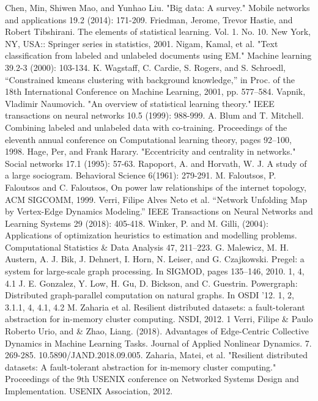 \documentclass[conference]{IEEEtran}
\begin{document}
\newpage
\begin{thebibliography}{00}
 Chen, Min, Shiwen Mao, and Yunhao Liu. "Big data: A survey." Mobile networks and applications 19.2 (2014): 171-209.
 Friedman, Jerome, Trevor Hastie, and Robert Tibshirani. The elements of statistical learning. Vol. 1. No. 10. New York, NY, USA:: Springer series in statistics, 2001.
 Nigam, Kamal, et al. "Text classification from labeled and unlabeled documents using EM." Machine learning 39.2-3 (2000): 103-134.
 K. Wagstaff, C. Cardie, S. Rogers, and S. Schroedl, “Constrained kmeans clustering with background knowledge,” in Proc. of the 18th International Conference on Machine Learning, 2001, pp. 577–584.
 Vapnik, Vladimir Naumovich. "An overview of statistical learning theory." IEEE transactions on neural networks 10.5 (1999): 988-999.
A. Blum and T. Mitchell. Combining labeled and unlabeled data with co-training. Proceedings of the eleventh annual conference on Computational learning theory, pages 92–100, 1998.
Hage, Per, and Frank Harary. "Eccentricity and centrality in networks." Social networks 17.1 (1995): 57-63.
Rapoport, A. and Horvath, W. J. A study of a large sociogram. Behavioral Science 6(1961): 279-291. 
M. Faloutsos, P. Faloutsos and C. Faloutsos, On power law 
relationships of the internet topology, ACM SIGCOMM, 1999. 
 Verri, Filipe Alves Neto et al. “Network Unfolding Map by Vertex-Edge Dynamics Modeling.” IEEE Transactions on Neural Networks and Learning Systems 29 (2018): 405-418.
 Winker, P. and M. Gilli, (2004): Applications of optimization
heuristics to estimation and modelling problems. Computational
Statistics \& Data Analysis 47, 211–223.
 G. Malewicz, M. H. Austern, A. J. Bik, J. Dehnert, I. Horn,
N. Leiser, and G. Czajkowski. Pregel: a system for large-scale
graph processing. In SIGMOD, pages 135–146, 2010. 1, 4, 4.1
 J. E. Gonzalez, Y. Low, H. Gu, D. Bickson, and C. Guestrin.
Powergraph: Distributed graph-parallel computation on
natural graphs. In OSDI ’12. 1, 2, 3.1.1, 4, 4.1, 4.2
 M. Zaharia et al. Resilient distributed datasets: a fault-tolerant abstraction for in-memory cluster computing. NSDI, 2012. 1
 Verri, Filipe & Paulo Roberto Urio, and & Zhao, Liang. (2018). Advantages of Edge-Centric Collective Dynamics in Machine Learning Tasks. Journal of Applied Nonlinear Dynamics. 7. 269-285. 10.5890/JAND.2018.09.005. 
 Zaharia, Matei, et al. "Resilient distributed datasets: A fault-tolerant abstraction for in-memory cluster computing." Proceedings of the 9th USENIX conference on Networked Systems Design and Implementation. USENIX Association, 2012.
\end{thebibliography}
\vspace{12pt}
\end{document}
